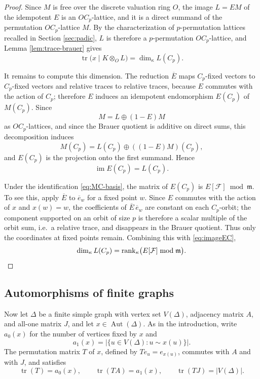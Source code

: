 \documentclass[11pt]{article}
\theoremstyle{plain}
\theoremstyle{remark}
\newcommand{\Aut}{\operatorname{Aut}}
\newcommand{\tr}{\operatorname{tr}}
\newcommand{\rank}{\operatorname{rank}}
\begin{document}
\begin{proof}
Since $M$ is free over the discrete valuation ring $O$, the image $L=EM$ of the idempotent $E$ is an $OC_p$-lattice,
and it is a direct summand of the permutation $OC_p$-lattice $M$.
By the characterization of $p$-permutation lattices recalled in Section \ref{sec:padic},
$L$ is therefore a $p$-permutation $OC_p$-lattice, and Lemma \ref{lem:trace-brauer} gives
\[
 \tr\bigl(x\mid K\otimes_O L\bigr)=\dim_\kappa L(C_p).
\]

It remains to compute this dimension.
The reduction $\overline E$ maps $C_p$-fixed vectors to $C_p$-fixed vectors and relative traces to relative traces,
because $E$ commutes with the action of $C_p$; therefore $E$ induces an idempotent endomorphism $E(C_p)$ of $M(C_p)$.
Since
\[
 M=L\oplus (1-E)M
\]
as $OC_p$-lattices, and since the Brauer quotient is additive on direct sums, this decomposition induces
\[
 M(C_p)=L(C_p)\oplus ((1-E)M)(C_p),
\]
and $E(C_p)$ is the projection onto the first summand.  Hence
\begin{equation}\label{eq:imageEC}
 \operatorname{im}E(C_p)=L(C_p).
\end{equation}

Under the identification \eqref{eq:MC-basis}, the matrix of $E(C_p)$ is $E[\mathcal F]\bmod\mathfrak m$.
To see this, apply $\overline E$ to $\overline e_w$ for a fixed point $w$.
Since $E$ commutes with the action of $x$ and $x(w)=w$,
the coefficients of $\overline E\,\overline e_w$ are constant on each $C_p$-orbit;
the component supported on an orbit of size $p$ is therefore a scalar multiple of the orbit sum,
i.e.\ a relative trace, and disappears in the Brauer quotient.
Thus only the coordinates at fixed points remain.
Combining this with \eqref{eq:imageEC},
\[
 \dim_\kappa L(C_p)=\rank_\kappa\bigl(E[\mathcal F]\bmod\mathfrak m\bigr).\qedhere
\]
\end{proof}

\subsection{Automorphisms of finite graphs}\label{subsec:graphs}

Now let $\Delta$ be a finite simple graph with vertex set $V(\Delta)$, adjacency matrix $A$, and all-one matrix $J$,
and let $x\in\Aut(\Delta)$.
As in the introduction, write $a_0(x)$ for the number of vertices fixed by $x$ and
\[
 a_1(x)=\bigl|\{u\in V(\Delta):u\sim x(u)\}\bigr|.
\]
The permutation matrix $T$ of $x$, defined by $Te_u=e_{x(u)}$, commutes with $A$ and with $J$, and satisfies
\begin{equation}\label{eq:traces}
 \tr(T)=a_0(x),\qquad \tr(TA)=a_1(x),\qquad \tr(TJ)=|V(\Delta)|.
\end{equation}
\end{document}

